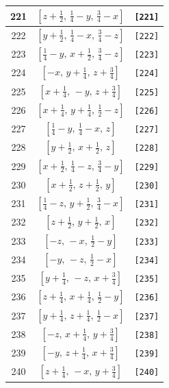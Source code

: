 \documentclass[fleqn,8pt]{jsarticle}
\begin{document}
\begin{longtable}{ccc}
221 & $\left[ z + \frac{1}{2},\, \frac{1}{4} - y,\, \frac{3}{4} - x \right]$ & {\tt [221]} \\ \hline
222 & $\left[ y + \frac{1}{2},\, \frac{1}{4} - x,\, \frac{3}{4} - z \right]$ & {\tt [222]} \\ \hline
223 & $\left[ \frac{1}{4} - y,\, x + \frac{1}{2},\, \frac{3}{4} - z \right]$ & {\tt [223]} \\ \hline
224 & $\left[ - x,\, y + \frac{1}{4},\, z + \frac{3}{4} \right]$ & {\tt [224]} \\ \hline
225 & $\left[ x + \frac{1}{4},\, - y,\, z + \frac{3}{4} \right]$ & {\tt [225]} \\ \hline
226 & $\left[ x + \frac{1}{4},\, y + \frac{1}{4},\, \frac{1}{2} - z \right]$ & {\tt [226]} \\ \hline
227 & $\left[ \frac{1}{4} - y,\, \frac{1}{4} - x,\, z \right]$ & {\tt [227]} \\ \hline
228 & $\left[ y + \frac{1}{2},\, x + \frac{1}{2},\, z \right]$ & {\tt [228]} \\ \hline
229 & $\left[ x + \frac{1}{2},\, \frac{1}{4} - z,\, \frac{3}{4} - y \right]$ & {\tt [229]} \\ \hline
230 & $\left[ x + \frac{1}{2},\, z + \frac{1}{2},\, y \right]$ & {\tt [230]} \\ \hline
231 & $\left[ \frac{1}{4} - z,\, y + \frac{1}{2},\, \frac{3}{4} - x \right]$ & {\tt [231]} \\ \hline
232 & $\left[ z + \frac{1}{2},\, y + \frac{1}{2},\, x \right]$ & {\tt [232]} \\ \hline
233 & $\left[ - z,\, - x,\, \frac{1}{2} - y \right]$ & {\tt [233]} \\ \hline
234 & $\left[ - y,\, - z,\, \frac{1}{2} - x \right]$ & {\tt [234]} \\ \hline
235 & $\left[ y + \frac{1}{4},\, - z,\, x + \frac{3}{4} \right]$ & {\tt [235]} \\ \hline
236 & $\left[ z + \frac{1}{4},\, x + \frac{1}{4},\, \frac{1}{2} - y \right]$ & {\tt [236]} \\ \hline
237 & $\left[ y + \frac{1}{4},\, z + \frac{1}{4},\, \frac{1}{2} - x \right]$ & {\tt [237]} \\ \hline
238 & $\left[ - z,\, x + \frac{1}{4},\, y + \frac{3}{4} \right]$ & {\tt [238]} \\ \hline
239 & $\left[ - y,\, z + \frac{1}{4},\, x + \frac{3}{4} \right]$ & {\tt [239]} \\ \hline
240 & $\left[ z + \frac{1}{4},\, - x,\, y + \frac{3}{4} \right]$ & {\tt [240]} \\ \hline

\end{longtable}
\end{document}
